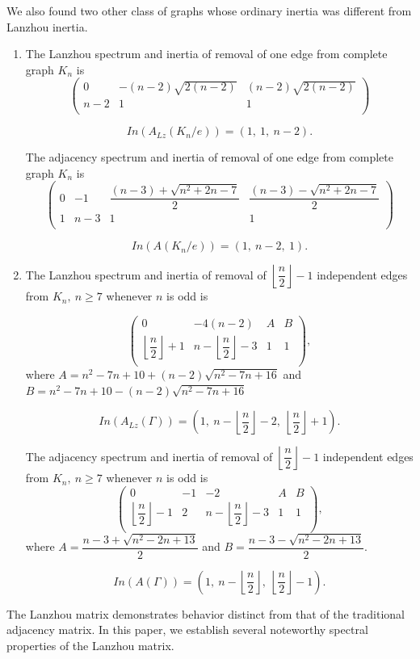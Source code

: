 \documentclass[10pt,a4paper,oneside]{article}
\begin{document}
We also found two other class of graphs whose ordinary inertia was different from Lanzhou inertia.
\begin{enumerate}
\item  The Lanzhou spectrum and inertia of removal of one edge from complete graph $K_n$ is
$$\begin{pmatrix}
0 & -(n-2)\sqrt{2(n-2)} & (n-2)\sqrt{2(n-2)}\\
n-2&1 &1\\
\end{pmatrix}$$

$$In(A_{Lz}(K_n/e))=(1,\ 1,\ n-2).$$

The adjacency spectrum and inertia of removal of one edge from complete graph $K_n$ is
$$\begin{pmatrix}
0 &-1& \dfrac{(n-3)+\sqrt{n^2+2n-7}}{2} & \dfrac{(n-3)-\sqrt{n^2+2n-7}}{2}\\
1&n-3& 1 &1\\
\end{pmatrix}$$

$$In(A(K_n/e))=(1,\ n-2,\ 1).$$

\item The Lanzhou spectrum and inertia of removal of $\left\lfloor \dfrac{n}{2}\right\rfloor-1$ independent edges from $K_n,\ n\geq 7$ whenever $n$ is odd is

$$\begin{pmatrix}
0 & -4(n-2) & A & B\\
\left\lfloor \dfrac{n}{2}\right\rfloor+1 &n- \left\lfloor \dfrac{n}{2}\right\rfloor-3 &1 &1\\
\end{pmatrix},$$
where $A=n^2-7n+10+(n-2)\sqrt{n^2-7n+16}$ and $B=n^2-7n+10-(n-2)\sqrt{n^2-7n+16}$

$$In(A_{Lz}(\Gamma))=(1,\ n- \left\lfloor \dfrac{n}{2}\right\rfloor-2,\ \left\lfloor \dfrac{n}{2}\right\rfloor+1).$$

 The adjacency spectrum and inertia of removal of $\left\lfloor \dfrac{n}{2}\right\rfloor-1$ independent edges from $K_n,\ n\geq 7$ whenever $n$ is odd is
$$\begin{pmatrix}
0 & -1&-2&A&B\\
\left\lfloor \dfrac{n}{2}\right\rfloor-1&2&n-\left\lfloor \dfrac{n}{2}\right\rfloor-3&1&1\\
\end{pmatrix},$$
where $A=\dfrac{n-3+\sqrt{n^2-2n+13}}{2}$ and $B=\dfrac{n-3-\sqrt{n^2-2n+13}}{2}.$

$$In(A(\Gamma))=(1,\ n- \left\lfloor \dfrac{n}{2}\right\rfloor,\ \left\lfloor \dfrac{n}{2}\right\rfloor-1).$$
\end{enumerate}
The Lanzhou matrix demonstrates behavior distinct from that of the traditional adjacency matrix. In this paper, we establish several noteworthy spectral properties of the Lanzhou matrix.
\end{document}
